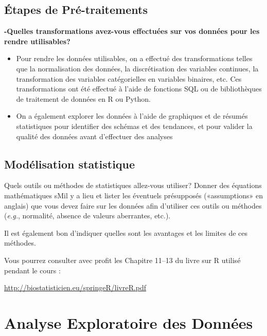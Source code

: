 \documentclass[mstat,12pt]{unswthesis}
\begin{document}
\hypertarget{uxe9tapes-de-pruxe9-traitements}{%
\section{Étapes de
Pré-traitements}\label{uxe9tapes-de-pruxe9-traitements}}

\textbf{-Quelles transformations avez-vous effectuées sur vos données
pour les rendre utilisables?}

\begin{itemize}
\tightlist
\item
  Pour rendre les données utilisables, on a effectué des transformations
  telles que la normalisation des données, la discrétisation des
  variables continues, la transformation des variables catégorielles en
  variables binaires, etc. Ces transformations ont été effectué à l'aide
  de fonctions SQL ou de bibliothèques de traitement de données en R ou
  Python.
\item
  On a également explorer les données à l'aide de graphiques et de
  résumés statistiques pour identifier des schémas et des tendances, et
  pour valider la qualité des données avant d'effectuer des analyses
\end{itemize}

\hypertarget{moduxe9lisation-statistique}{%
\section{Modélisation statistique}\label{moduxe9lisation-statistique}}

Quels outils ou méthodes de statistiques allez-vous utiliser? Donner des
équations mathématiques sMil y a lieu et lister les éventuels
présupposés («assumptions» en anglais) que vous devez faire sur les
données afin d'utiliser ces outils ou méthodes (\emph{e.g.}, normalité,
absence de valeurs aberrantes, etc.).

Il est également bon d'indiquer quelles sont les avantages et les
limites de ces méthodes.

Vous pourrez consulter avec profit les Chapitre 11--13 du livre sur R
utilisé pendant le cours :

\url{http://biostatisticien.eu/springeR/livreR.pdf}

\hypertarget{analyse-exploratoire-des-donnuxe9es}{%
\chapter{Analyse Exploratoire des
Données}\label{analyse-exploratoire-des-donnuxe9es}}
\end{document}
